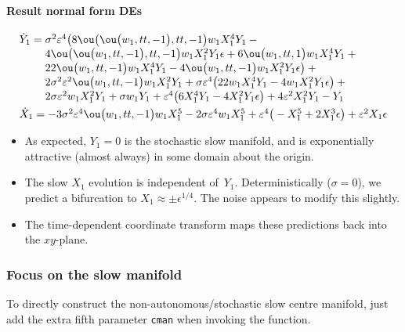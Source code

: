 \paragraph{Result normal form DEs}
\begin{align*}&
\dot Y_{1}=\ParMath{\sigma ^{2} \eps^{4} \big(8 \ou\big(\ou\big(w_{1},tt,-1\big),
tt,-1\big) w_{1} X_{1}^{4} Y_{1}-4 \ou\big(\ou\big(w_{1},tt,-1\big),tt,
-1\big) w_{1} X_{1}^{2} Y_{1} \epsilon +6 \ou\big(w_{1},tt,1\big) w_{1} 
X_{1}^{4} Y_{1}+22 \ou\big(w_{1},tt,-1\big) w_{1} X_{1}^{4} Y_{1}-4 \ou
\big(w_{1},tt,-1\big) w_{1} X_{1}^{2} Y_{1} \epsilon \big)+2 \sigma ^{2}
 \eps^{2} \ou\big(w_{1},tt,-1\big) w_{1} X_{1}^{2} Y_{1}+\sigma  \eps^{4
} \big(22 w_{1} X_{1}^{4} Y_{1}-4 w_{1} X_{1}^{2} Y_{1} \epsilon \big)+2
 \sigma  \eps^{2} w_{1} X_{1}^{2} Y_{1}+\sigma  w_{1} Y_{1}+\eps^{4} 
\big(6 X_{1}^{4} Y_{1}-4 X_{1}^{2} Y_{1} \epsilon \big)+4 \eps^{2} X_{1}
^{2} Y_{1}-Y_{1}
}
\\&
\dot X_{1}=\ParMath{-3 \sigma ^{2} \eps^{4} \ou\big(w_{1},tt,-1\big) w_{1} X_{1}
^{5}-2 \sigma  \eps^{4} w_{1} X_{1}^{5}+\eps^{4} \big(-X_{1}^{5}+2 X_{1}
^{3} \epsilon \big)+\eps^{2} X_{1} \epsilon 
}
\end{align*}
\begin{itemize}
\item As expected, \(Y_1=0\) is the stochastic slow manifold, and is exponentially attractive (almost always) in some domain about the origin.
\item The slow \(X_1\) evolution is independent of~\(Y_1\).  
Deterministically (\(\sigma=0\)), we predict a bifurcation to \(X_1\approx \pm\epsilon^{1/4}\).  The noise appears to modify this slightly.
\item The time-dependent coordinate transform maps these predictions back into the \(xy\)-plane.
\end{itemize}



\subsubsection{Focus on the slow manifold}

To directly construct the non-autonomous\slash stochastic slow centre manifold, just add the extra fifth parameter \verb|cman| when invoking the function.

